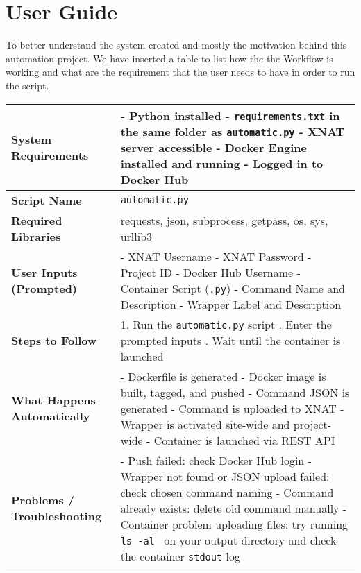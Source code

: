 \chapter{User Guide}
To better understand the system created and mostly the motivation behind this automation project. We have inserted a table to list how the the Workflow is working and what are the requirement that the user needs to have in order to run the script.


\begin{center}
\begin{tabular}{|l|p{9cm}|}
\hline
\textbf{System Requirements} & 
- Python installed \newline
- \texttt{requirements.txt} in the same folder as \texttt{automatic.py} \newline
- XNAT server accessible \newline
- Docker Engine installed and running \newline
- Logged in to Docker Hub \\
\hline
\textbf{Script Name} & \texttt{automatic.py} \\
\hline
\textbf{Required Libraries} & requests, json, subprocess, getpass, os, sys, urllib3 \\
\hline
\textbf{User Inputs (Prompted)} & 
- XNAT Username \newline
- XNAT Password \newline
- Project ID \newline
- Docker Hub Username \newline
- Container Script (\texttt{.py}) \newline
- Command Name and Description \newline
- Wrapper Label and Description \\
\hline
\textbf{Steps to Follow} & 
1. Run the \texttt{automatic.py} script \newline
2. Enter the prompted inputs \newline
3. Wait until the container is launched \\
\hline
\textbf{What Happens Automatically} & 
- Dockerfile is generated \newline
- Docker image is built, tagged, and pushed \newline
- Command JSON is generated \newline
- Command is uploaded to XNAT \newline
- Wrapper is activated site-wide and project-wide \newline
- Container is launched via REST API \\
\hline
\textbf{Problems / Troubleshooting} & 
- Push failed: check Docker Hub login \newline
- Wrapper not found or JSON upload failed: check chosen command naming \newline
- Command already exists: delete old command manually \newline
- Container problem uploading files: try running \texttt{ls -al \*} on your output directory and check the container \texttt{stdout} log \\
\hline
\end{tabular}
\end{center}

